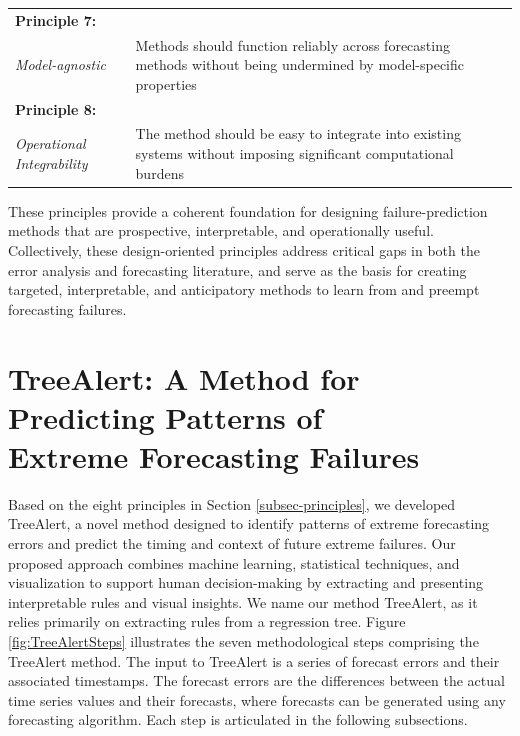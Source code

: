 \documentclass[]{interact}
\theoremstyle{definition}
\begin{document}
\begin{table}
\begin{tabular}{|m{2.7cm}|m{12.5cm}|}
\hline
\centering\textbf{Principle 7:} \\ \centering\textit{Model-agnostic} & Methods should function reliably across forecasting methods without being undermined by model-specific properties \\
\hline
\centering\textbf{Principle 8:} \\ \centering\textit{Operational Integrability} & The method should be easy to integrate into existing  systems without \newline imposing significant computational burdens \\
\hline
\end{tabular}
\label{tab:principles}
\end{table}

These principles provide a coherent foundation for designing failure-prediction methods that are prospective, interpretable, and operationally useful. Collectively, these design-oriented principles address critical gaps in both the error analysis and forecasting literature, and serve as the basis for creating targeted, interpretable, and anticipatory methods to learn from and preempt forecasting failures. %

\section{TreeAlert: A Method for Predicting Patterns of\\Extreme Forecasting Failures}
\label{sec:treealert_method}

Based on the eight principles in Section \ref{subsec-principles}, we developed TreeAlert, a novel method designed to identify patterns of extreme forecasting errors and predict the timing and context of future extreme failures. Our proposed approach combines machine learning, statistical techniques, and visualization to support human decision-making by extracting and presenting interpretable rules and visual insights. We name our method TreeAlert, as it relies primarily on extracting rules from a regression tree. Figure \ref{fig:TreeAlertSteps} illustrates the seven methodological steps comprising the TreeAlert method. The input to TreeAlert is a series of forecast errors and their associated timestamps. The forecast errors are the differences between the actual time series values and their forecasts, where forecasts can be generated using any forecasting algorithm. Each step is articulated in the following subsections.
\end{document}
